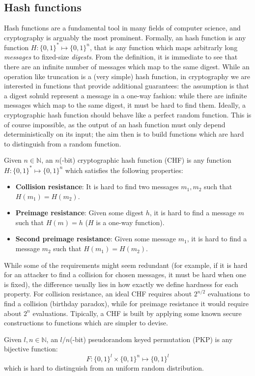 \subsection{Hash functions}
Hash functions are a fundamental tool in many fields of computer science, and cryptography is
arguably the most prominent.
Formally, an hash function is any function \(H\colon {\{0, 1\}}^{*} \mapsto {\{0, 1\}}^n\), that
is any function which maps arbitrarly long \emph{messages} to fixed-size \emph{digests}.
From the definition, it is immediate to see that there are an infinite number of messages which map
to the same digest.
While an operation like truncation is a (very simple) hash function, in cryptography we are
interested in functions that provide additional guarantees: the assumption is that a digest sohuld
represent a message in a one-way fashion: while there are infinite messages which map to the same
digest, it must be hard to find them.
Ideally, a cryptographic hash function should behave like a perfect random function.
This is of course impossible, as the output of an hash function must only depend deterministically
on its input; the aim then is to build functions which are hard to distinguish from a random
function.
\begin{definition}
	Given \(n \in \mathbb{N}\), an \(n\)(-bit) cryptographic hash function (CHF) is any function
	\(H\colon {\{0, 1\}}^{*} \mapsto {\{0, 1\}}^n\) which satisfies the following properties:
	\begin{itemize}
		\item \textbf{Collision resistance}: It is hard to find two messages \(m_1, m_2\) such
		      that \(H(m_1) = H(m_2)\).
		\item \textbf{Preimage resistance}: Given some digest \(h\), it is hard to find a
		      message \(m\) such that \(H(m) = h\) (\(H\) is a one-way function).
		\item \textbf{Second preimage resistance}: Given some message \(m_1\), it is hard to
		      find a message \(m_2\) such that \(H(m_1) = H(m_2)\).
	\end{itemize}
\end{definition}

\noindent While some of the requirements might seem redundant (for example, if it is hard for an
attacker to find a collision for chosen messages, it must be hard when one is fixed),
the difference usually lies in how exactly we define hardness for each property.
For collision resistance, an ideal CHF requires about \(2^{n/2}\) evaluations to find a collision
(birthday paradox), while for preimage resistance it would require about \(2^n\) evaluations.
Tipically, a CHF is built by applying some known secure constructions to functions which are
simpler to devise.
\begin{definition}
	Given \(l, n \in \mathbb{N}\), an \(l/n\)(-bit) pseudorandom keyed permutation (PKP) is any
	bijective function:
	\[F\colon {\{0, 1\}}^l \times {\{0, 1\}}^n \mapsto {\{0, 1\}}^l\]
	which is hard to distinguish from an uniform random distribution.
\end{definition}

